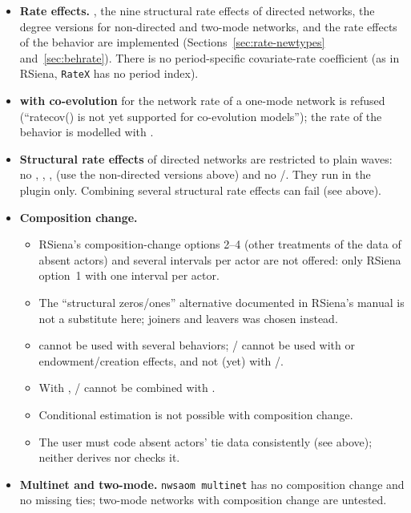 \begin{itemize}
\item \textbf{Rate effects.} , the nine structural rate effects of directed networks, the degree versions for non-directed and two-mode networks, and the rate effects of the behavior are implemented (Sections~\ref{sec:rate-newtypes} and~\ref{sec:behrate}). There is no period-specific covariate-rate coefficient (as in RSiena, \texttt{RateX} has no period index).
\item \textbf{ with co-evolution} for the network rate of a one-mode network is refused (``ratecov() is not yet supported for co-evolution models''); the rate of the behavior is modelled with .
\item \textbf{Structural rate effects} of directed networks are restricted to plain waves: no , , ,  (use the non-directed versions above) and no /. They run in the plugin only. Combining several structural rate effects can fail (see above).
\item \textbf{Composition change.}
  \begin{itemize}[nosep]
  \item RSiena's composition-change options 2--4 (other treatments of the data of absent actors) and several intervals per actor are not offered: only RSiena option~1 with one interval per actor.
  \item The ``structural zeros/ones'' alternative documented in RSiena's manual is not a substitute here; joiners and leavers was chosen instead.
  \item {} cannot be used with several behaviors; / cannot be used with  or endowment/creation effects, and not (yet) with /.
  \item With , / cannot be combined with .
  \item Conditional estimation is not possible with composition change.
  \item The user must code absent actors' tie data consistently (see above); \nwsaom{} neither derives nor checks it.
  \end{itemize}
\item \textbf{Multinet and two-mode.} \texttt{nwsaom multinet} has no composition change and no missing ties; two-mode networks with composition change are untested.
\end{itemize}
\endgroup
